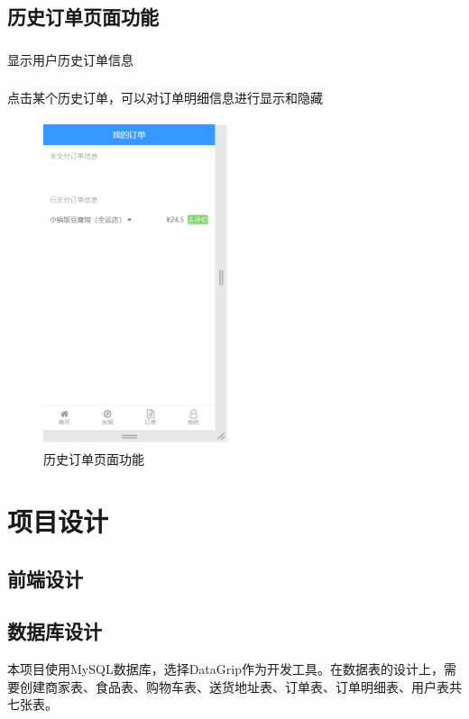 \subsection{历史订单页面功能}
\subsubsection*{}
显示用户历史订单信息
\subsubsection*{}
点击某个历史订单，可以对订单明细信息进行显示和隐藏
\begin{figure}[H]
    \centering
    \includegraphics[width=5.4cm,height=9.6cm]{figures/3.1.11.png}
    \caption{历史订单页面功能}
\end{figure}


\section{项目设计}

\subsection{前端设计}

\subsection{数据库设计}
本项目使用MySQL数据库，选择DataGrip作为开发工具。在数据表的设计上，需要创建商家表、食品表、购物车表、送货地址表、订单表、订单明细表、用户表共七张表。

